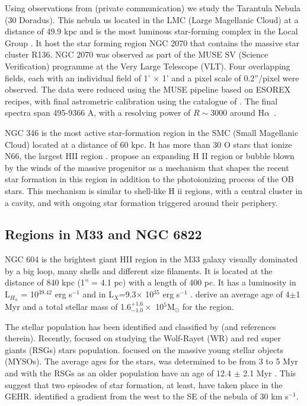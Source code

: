 \documentclass[fleqn,usenatbib, useAMS, a4paper]{mnras}
\newcommand\halpha{H${\alpha}$}
\begin{document}
Using observations from \citet{Castro:2018a} (private communication) we study the Tarantula Nebula (30 Doradus).
This nebula us located in the LMC (Large Magellanic Cloud) at a distance of 49.9 kpc \citep{2013Natur.495...76P} and is the most luminous star-forming complex in the Local Group \citep{1984ApJ...287..116K}.
It host the star forming region NGC 2070 that contains the massive star cluster R136.
NGC 2070 was observed as part of the MUSE SV (Science Verification) programme at the Very Large Telescope (VLT). 
Four overlapping fields, each with an individual field of 1' \(\times\) 1' and a pixel scale of 0.2''/pixel were observed. 
The data were reduced using the MUSE pipeline based on ESOREX recipes, with final astrometric calibration using the catalogue of \citet{1999A&A...341...98S}. 
The final spectra span 495-9366 A, with a resolving power of \(R \sim3 000\) around \halpha\  \citep{Castro:2018a}.

NGC 346 is the most active star-formation region in the SMC (Small Magellanic Cloud) located at a distance of 60 kpc. 
It has more than 30 O stars that ionize N66, the largest HII region \citep{2011ApJ...740...10D}.
\citet{2008ApJ...688.1050G} propose an expanding H II region or bubble blown by the winds of the massive progenitor as a mechanism that shapes the recent star formation in this region in addition to the photoionizing process of the OB stars. 
This mechanism is similar to shell-like H ii regions, with a central cluster in a cavity, and with ongoing star formation triggered around their periphery.

\subsection{Regions in M33 and NGC 6822} 

NGC 604 is the brightest giant HII region in the M33 galaxy visually dominated by a big loop, many shells and different size filaments.
It is located at the distance of 840 kpc (1'' = 4.1 pc) \citep{2015KamKinematics} with a length of 400 pc.
It has a luminosity in L$_{H_\alpha}$ = 10$^{39.42}$ erg s$^{-1}$ \citep{2002MNRAS.329..481B} and in L$_{X}$=9.3$\times$ 10$^{35}$ erg s$^{-1}$ \citep{2008ApJ...685..919T}.
\citet{2012ApJ...761....3M} derive an average age of 4$\pm$1 Myr and a total stellar mass of 1.6$^{+1.6}_{-1.0} \times$ 10$^{5}$M$_{\odot}$ for the region.

The stellar population has been identified and classified by \citet{1996ApJ...456..174H} (and references therein).
Recently, \citet{2011MNRAS.411..235E} focused on studying the Wolf-Rayet (WR) and red super giants (RSGs) stars population.
\citet{2012AJ....143...43F} focused on the massive young stellar objects (MYSOs).
 The average ages for the stars, was determined to be from 3 to 5 Myr \citep{1996ApJ...456..174H} and with the RSGs as an older population have an age of 12.4 $\pm$ 2.1 Myr \citep{2011MNRAS.411..235E}.
This suggest that two episodes of star formation, at least, have taken place in the GEHR.
\citep{1984A&A...141...49H} identified a gradient from the west to the SE of the nebula of 30 km s$^{-1}$.
\end{document}
